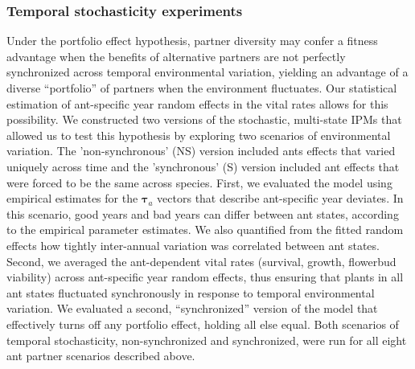 \documentclass[11pt]{article}
\begin{document}
\subsubsection*{Temporal stochasticity experiments}
Under the portfolio effect hypothesis, partner diversity may confer a fitness advantage when the benefits of alternative partners are not perfectly synchronized across temporal environmental variation, yielding an advantage of a diverse ``portfolio'' of partners when the environment fluctuates. 
Our statistical estimation of ant-specific year random effects in the vital rates allows for this possibility. 
We constructed two versions of the stochastic, multi-state IPMs that allowed us to test this hypothesis by exploring two scenarios of environmental variation.
The 'non-synchronous' (NS) version included ants effects that varied uniquely across time and the 'synchronous' (S) version included  ant effects that were forced to be the same across species. 
First, we evaluated the model using empirical estimates for the $\pmb{\tau}_{a}$ vectors that describe ant-specific year deviates. 
In this scenario, good years and bad years can differ between ant states, according to the empirical parameter estimates. 
We also quantified from the fitted random effects how tightly inter-annual variation was correlated between ant states.
Second, we averaged the ant-dependent vital rates (survival, growth, flowerbud viability) across ant-specific year random effects, thus ensuring that plants in all ant states fluctuated synchronously in response to temporal environmental variation. 
We evaluated a second, ``synchronized'' version of the model that effectively turns off any portfolio effect, holding all else equal. 
Both scenarios of temporal stochasticity, non-synchronized and synchronized, were run for all eight ant partner scenarios described above. 
\end{document}

